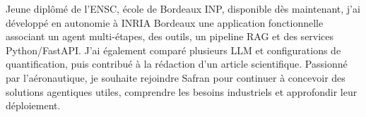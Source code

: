 
\begin{cvparagraph}
Jeune diplômé de l’ENSC, école de Bordeaux INP, disponible dès maintenant, j’ai développé en autonomie à INRIA Bordeaux une application fonctionnelle associant un agent multi-étapes, des outils, un pipeline RAG et des services Python/FastAPI. J’ai également comparé plusieurs LLM et configurations de quantification, puis contribué à la rédaction d’un article scientifique. Passionné par l’aéronautique, je souhaite rejoindre Safran pour continuer à concevoir des solutions agentiques utiles, comprendre les besoins industriels et approfondir leur déploiement.
\end{cvparagraph}
